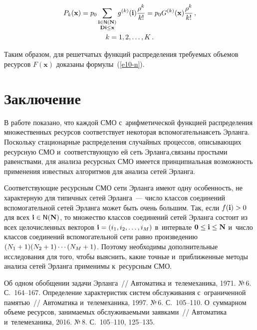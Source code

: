 \begin{multicols}{2}
\vspace*{-12pt}

\noindent
\begin{multline*}
P_k(\mathbf{x}) = p_0 
\sum\limits_{\substack{{\mathbf{i}\in{\sf N}(\mathbf{N})}\\ {\mathbf{Di}\leq 
\mathbf{x}}}} g^{(k)} (\mathbf{i}) \displaystyle\frac{\displaystyle \rho^k\mathstrut}{\displaystyle k!\mathstrut} =p_0 G^{(k)} 
(\mathbf{x})\displaystyle\frac{\displaystyle \rho^k\mathstrut}{\displaystyle k!\mathstrut}\,,\\ k=1,2,\ldots ,K\,.
\end{multline*}

Таким образом, для решетчатых функций распределения требуемых объемов 
ресурсов $F(\mathbf{x})$ доказаны формулы~(\ref{e10-n}). 

\section{Заключение}

  В работе показано, что каждой СМО с~арифметической функцией 
распределения множественных ресурсов соответствует некоторая 
вспомогательная\linebreak сеть Эрланга. Поскольку стационарные распределения 
случайных процессов, описывающих ресурсную СМО и~соответствующую ей 
сеть Эрланга,\linebreak связаны простыми равенствами, для анализа ресурсных СМО 
имеется принципиальная возможность применения известных алгоритмов для 
анализа сетей Эрланга. 
  
  Соответствующие ресурсным СМО сети Эрланга имеют одну особенность, 
не характерную для типичных сетей Эрланга~--- число классов соединений 
вспомогательной сетей Эрланга может быть очень большим. Так, если 
$f(\mathbf{i})\hm>0$ для всех $\mathbf{i}\hm\in {\sf N}(\mathbf{N})$, то 
множество классов соединений сетей Эрланга состоит из всех целочисленных 
векторов $\mathbf{i}\hm= (i_1, i_2, \ldots , i_M)$ в~интервале $\mathbf{0}\hm\leq 
\mathbf{i}\hm\leq \mathbf{N}$ и~число классов соединений вспомогательной 
сети равно произведению $(N_1\hm+1)(N_2\hm+1)\cdots (N_M\hm+1)$. 
Поэтому необходимы дополнительные исследования для того, чтобы выяснить, 
какие точные и~приближенные методы анализа сетей Эрланга применимы 
к~ресурсным СМО.

{\small\frenchspacing
 {%
 \begin{thebibliography}{9}
 Об одном обобщении задачи Эрланга~// Автоматика 
и~телемеханика, 1971. №\,6. С.~164--167.
 Определение характеристик систем обслуживания с~ограниченной 
памятью~// Автоматика и~телемеханика, 1997. №\,6. С.~105--110.
 О~суммарном объеме ресурсов, 
занимаемых обслуживаемыми заявками~// Автоматика и~телемеханика, 2016. №\,8.  
С.~105--110, 125--135.



\end{thebibliography}}}
\end{multicols}
